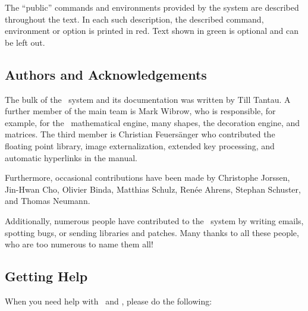 The ``public'' commands and environments provided by the system
are described throughout the text. In each such description, the
described command, environment or option is printed in red. Text shown
in green is optional and can be left out.


\subsection{Authors and Acknowledgements}
\label{section-authors}

The bulk of the \pgfname\ system and its documentation was written by
Till Tantau. A further member of the main team is Mark Wibrow, who
is responsible, for example, for the \pgfname\ mathematical engine,
many shapes, the decoration engine, and matrices. The third member is
Christian Feuers\"anger who contributed the floating point library,
image externalization, extended key processing, and automatic hyperlinks
in the manual.

Furthermore, occasional contributions have been made by Christophe
Jorssen, Jin-Hwan Cho, Olivier Binda, Matthias Schulz, Ren\'ee Ahrens,
Stephan Schuster, and Thomas Neumann.

Additionally, numerous people have contributed to the \pgfname\ system
by writing emails, spotting bugs, or sending libraries and patches.
Many thanks to all these people, who are too numerous to name them
all!



\subsection{Getting Help}

When you need help with \pgfname\ and \tikzname, please do the
following:

